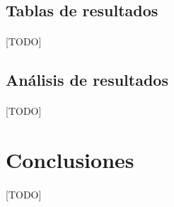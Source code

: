 \documentclass{subfiles}
\begin{document}
      \subsection{Tablas de resultados}
      \label{sec:results_tables}

        \paragraph{}
        [TODO]

      \subsection{Análisis de resultados}
      \label{sec:results_analysis}

        \paragraph{}
        [TODO]

    \section{Conclusiones}
    \label{sec:implementation_results_conclusions}

      \paragraph{}
      [TODO]
\end{document}
